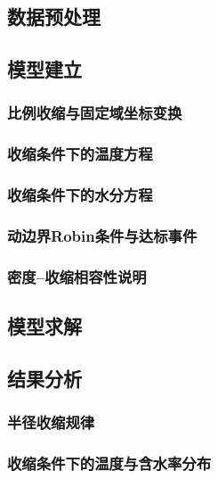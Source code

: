 \documentclass[withoutpreface,bwprint]{cumcmthesis}
\begin{document}

\subsection{数据预处理}


\subsection{模型建立}

\subsubsection{比例收缩与固定域坐标变换}
\subsubsection{收缩条件下的温度方程}
\subsubsection{收缩条件下的水分方程}
\subsubsection{动边界Robin条件与达标事件}
\subsubsection{密度--收缩相容性说明}

\subsection{模型求解}


\subsection{结果分析}

\subsubsection{半径收缩规律}
\subsubsection{收缩条件下的温度与含水率分布}
\end{document}
